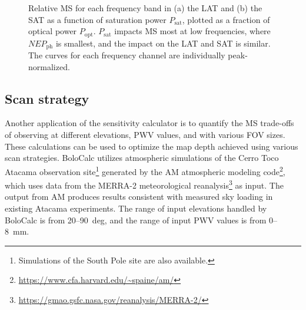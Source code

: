 \begin{figure}[!t]
    \hfill
    \caption{Relative MS for each frequency band in (a) the LAT and (b) the SAT as a function of saturation power $P_{\mathrm{sat}}$, plotted as a fraction of optical power $P_{\mathrm{opt}}$. $P_{\mathrm{sat}}$ impacts MS most at low frequencies, where $NEP_{\mathrm{ph}}$ is smallest, and the impact on the LAT and SAT is similar. The curves for each frequency channel are individually peak-normalized.}
    \label{fig:so_psat}
\end{figure}


\subsection{Scan strategy}
\label{sec:scan}

Another application of the sensitivity calculator is to quantify the MS trade-offs of observing at different elevations, PWV values, and with various FOV sizes. These calculations can be used to optimize the map depth achieved using various scan strategies.
BoloCalc utilizes atmospheric simulations of the Cerro Toco Atacama observation site\footnote{Simulations of the South Pole site are also available.} generated by the AM atmospheric modeling code\footnote{\url{https://www.cfa.harvard.edu/~spaine/am/}}, which uses data from the MERRA-2 meteorological reanalysis\footnote{\url{https://gmao.gsfc.nasa.gov/reanalysis/MERRA-2/}} as input. The output from AM produces results consistent with measured sky loading in existing Atacama experiments. The range of input elevations handled by BoloCalc is from 20--90~deg, and the range of input PWV values is from 0--8~mm. 

